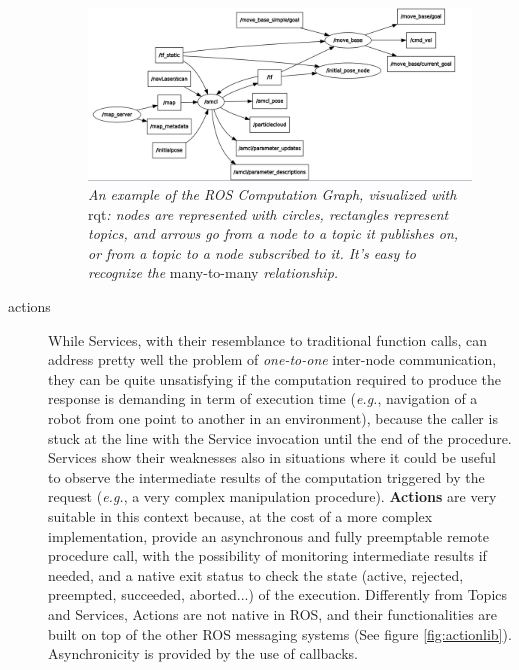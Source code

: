\begin{description}
\begin{figure}
	\centering
	\includegraphics[width=1.1\textwidth]{Images/background_and_tools/rqt_graph.png}
	\caption{\textit{An example of the \ac{ROS} Computation Graph, visualized with} rqt\textit{: nodes are represented with circles, rectangles represent topics, and arrows go from a node to a topic it publishes on, or from a topic to a node subscribed to it. It's easy to recognize the} many-to-many \textit{relationship.}}
	\label{fig:tfComputationGraph}
\end{figure}

\item[actions] While Services, with their resemblance to traditional function calls, can address pretty well the problem of \textit{one-to-one} inter-node communication, they can be quite unsatisfying if the computation required to produce the response is demanding in term of execution time (\textit{e.g.}, navigation of a robot from one point to another in an environment), because the caller is stuck at the line with the Service invocation until the end of the procedure. Services show their weaknesses also in situations where it could be useful to observe the intermediate results of the computation triggered by the request (\textit{e.g.}, a very complex manipulation procedure). \textbf{Actions} are very suitable in this context because, at the cost of a more complex implementation, provide an asynchronous and fully preemptable remote procedure call, with the possibility of monitoring intermediate results if needed, and a native exit status to check the state (active, rejected, preempted, succeeded, aborted...) of the execution. Differently from Topics and Services, Actions are not native in \ac{ROS}, and their functionalities are built on top of the other \ac{ROS} messaging systems (See figure \ref{fig:actionlib}). Asynchronicity is provided by the use of callbacks.
\end{description}

